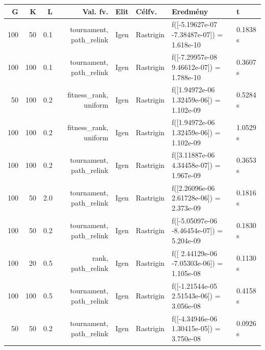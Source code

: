\begin{tabular}{rrrrllll}
G & K & L & Val. fv. & Elit & Célfv. & Eredmény & t \\
\hline
100 & 50 & 0.1 & tournament, path\_relink & Igen & Rastrigin & f([-5.19627e-07 -7.38487e-07]) = 1.618e-10 & 0.1838 s \\
100 & 100 & 0.1 & tournament, path\_relink & Igen & Rastrigin & f([-7.29957e-08  9.46612e-07]) = 1.788e-10 & 0.3607 s \\
50 & 100 & 0.2 & fitness\_rank, uniform & Igen & Rastrigin & f([1.94972e-06 1.32459e-06]) = 1.102e-09 & 0.5284 s \\
100 & 100 & 0.2 & fitness\_rank, uniform & Igen & Rastrigin & f([1.94972e-06 1.32459e-06]) = 1.102e-09 & 1.0529 s \\
100 & 100 & 0.2 & tournament, path\_relink & Igen & Rastrigin & f([3.11887e-06 4.34458e-07]) = 1.967e-09 & 0.3653 s \\
100 & 50 & 2.0 & tournament, path\_relink & Igen & Rastrigin & f([2.26096e-06 2.61728e-06]) = 2.373e-09 & 0.1816 s \\
100 & 50 & 0.2 & tournament, path\_relink & Igen & Rastrigin & f([-5.05097e-06 -8.46454e-07]) = 5.204e-09 & 0.1830 s \\
100 & 20 & 0.5 & rank, path\_relink & Igen & Rastrigin & f([ 2.44129e-06 -7.05303e-06]) = 1.105e-08 & 0.1130 s \\
100 & 100 & 0.5 & tournament, path\_relink & Igen & Rastrigin & f([-1.21544e-05  2.51543e-06]) = 3.056e-08 & 0.4158 s \\
50 & 50 & 0.2 & tournament, path\_relink & Igen & Rastrigin & f([-4.34946e-06  1.30415e-05]) = 3.750e-08 & 0.0926 s \\
\end{tabular}
